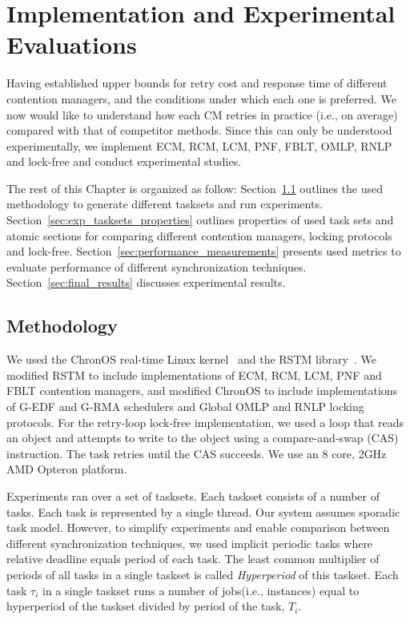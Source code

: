 \chapter{\label{ch:exp_work}Implementation and Experimental Evaluations}
%
Having established upper bounds for retry cost and response time of different contention managers, and the conditions under which each one is preferred. We now would like to understand how each CM retries in practice (i.e., on average) compared with that of competitor methods. Since this can only be understood experimentally, we implement ECM, RCM, LCM, PNF, FBLT, OMLP, RNLP and lock-free and conduct experimental studies.

The rest of this Chapter is organized as follow: Section~\ref{sec:methodology} outlines the used methodology to generate different tasksets and run experiments. Section~\ref{sec:exp_tasksets_properties} outlines properties of used task sets and atomic sections for comparing different contention managers, locking protocols and lock-free. Section~\ref{sec:performance_measurements} presents used metrics to evaluate performance of different synchronization techniques. Section~\ref{sec:final_results} discusses experimental results.
%
\section{Methodology}\label{sec:methodology}
%
We used the ChronOS real-time Linux kernel~\cite{dellinger2011chronos}
and the RSTM library~\cite{marathe2006lowering}. We modified RSTM to include implementations of ECM, RCM, LCM, PNF and FBLT contention managers, and modified ChronOS to include implementations of G-EDF and G-RMA schedulers and Global OMLP\cite{springerlink:10.1007/s10617-012-9090-1,key-3} and RNLP\cite{6257574} locking protocols. For the retry-loop lock-free implementation, we used a loop that reads an object and attempts to write to the object using a compare-and-swap (CAS) instruction. The task retries until the CAS succeeds. We use an 8 core, 2GHz AMD Opteron platform.

Experiments ran over a set of tasksets. Each taskset consists of a number of tasks. Each task is represented by a single thread. Our system assumes sporadic task model. However, to simplify experiments and enable comparison between different synchronization techniques, we used implicit periodic tasks where relative deadline equals period of each task. The least common multiplier of periods of all tasks in a single taskset is called \textit{Hyperperiod} of this taskset. Each task $\tau_i$ in a single taskset runs a number of jobs(i.e., instances) equal to hyperperiod of the taskset divided by period of the task, $T_i$.
%
